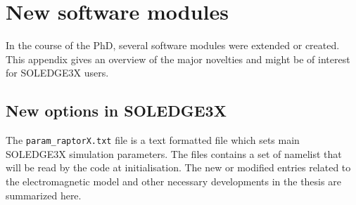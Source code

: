 \chapter{New software modules}
\label{chap:newModules}
In the course of the PhD, several software modules were extended or created. This appendix gives an overview of the major novelties and might be of interest for SOLEDGE3X users. 

\section{New options in SOLEDGE3X}
\label{sec:app_newS3Xoptions}

The \texttt{param\_raptorX.txt} file is a text formatted file which sets main SOLEDGE3X simulation parameters. The files contains a set of namelist that will be read by the code at initialisation. The new or modified entries related to the electromagnetic model and other necessary developments in the thesis are summarized here.
